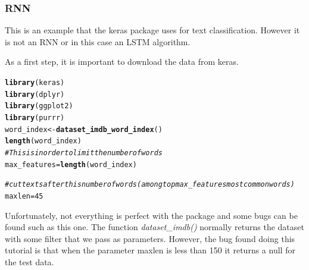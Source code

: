 \documentclass[letter,8pt]{article}\usepackage[]{graphicx}\usepackage[]{color}
\makeatletter
\newcommand{\hlnum}[1]{\textcolor[rgb]{0.686,0.059,0.569}{#1}}%
\newcommand{\hlcom}[1]{\textcolor[rgb]{0.678,0.584,0.686}{\textit{#1}}}%
\newcommand{\hlstd}[1]{\textcolor[rgb]{0.345,0.345,0.345}{#1}}%
\newcommand{\hlkwb}[1]{\textcolor[rgb]{0.69,0.353,0.396}{#1}}%
\newcommand{\hlkwd}[1]{\textcolor[rgb]{0.737,0.353,0.396}{\textbf{#1}}}%
\newenvironment{kframe}{%
 \def\at@end@of@kframe{}%
 \ifinner\ifhmode%
  \def\at@end@of@kframe{\end{minipage}}%
  \begin{minipage}{\columnwidth}%
 \fi\fi%
 \def\FrameCommand##1{\hskip\@totalleftmargin \hskip-\fboxsep
 \colorbox{shadecolor}{##1}\hskip-\fboxsep
     \hskip-\linewidth \hskip-\@totalleftmargin \hskip\columnwidth}%
 \MakeFramed {\advance\hsize-\width
   \@totalleftmargin\z@ \linewidth\hsize
   \@setminipage}}%
 {\par\unskip\endMakeFramed%
 \at@end@of@kframe}
\newenvironment{knitrout}{}{} %
\makeatother
\begin{document}
\subsubsection{RNN}


This is an example that the keras package uses for text classification. However it is not an RNN or in this case an LSTM algorithm.

As a first step, it is important to download the data from keras.
\begin{knitrout}
\color{fgcolor}\begin{kframe}
\begin{alltt}
\hlkwd{library}\hlstd{(keras)}
\hlkwd{library}\hlstd{(dplyr)}
\hlkwd{library}\hlstd{(ggplot2)}
\hlkwd{library}\hlstd{(purrr)}
\hlstd{word_index} \hlkwb{<-} \hlkwd{dataset_imdb_word_index}\hlstd{()}
\hlkwd{length}\hlstd{(word_index)}
\hlcom{# This is in order to limit the number of words }
\hlstd{max_features} \hlkwb{=} \hlkwd{length}\hlstd{(word_index)}

\hlcom{# cut texts after this number of words (among top max_features most common words)}
\hlstd{maxlen} \hlkwb{=} \hlnum{45}
\end{alltt}
\end{kframe}
\end{knitrout}
Unfortunately, not everything is perfect with the package and some bugs can be found such as this one. The function \textit{dataset\_imdb()} normally returns the dataset with some filter that we pass as parameters. However, the bug\cite{bugRNNkeras} found doing this tutorial is that when the parameter maxlen is less than 150 it returns a null for the test data.
\end{document}
